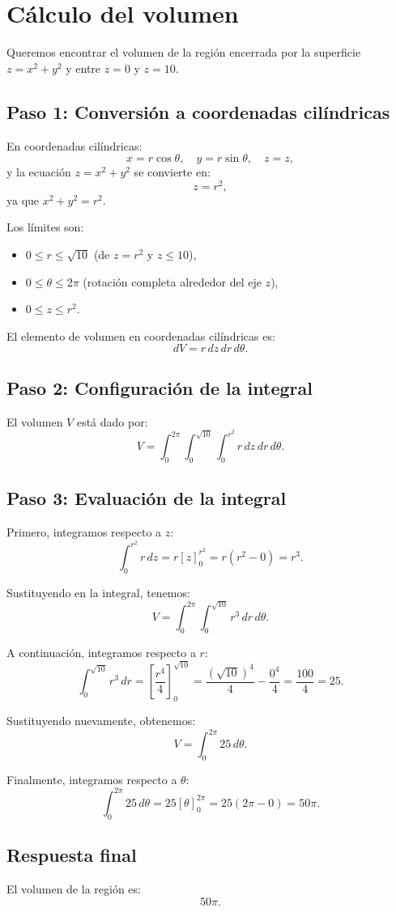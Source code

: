\section*{Cálculo del volumen}

Queremos encontrar el volumen de la región encerrada por la superficie \( z = x^2 + y^2 \) y entre \( z = 0 \) y \( z = 10 \).

\subsection*{Paso 1: Conversión a coordenadas cilíndricas}

En coordenadas cilíndricas:
\[
x = r\cos\theta, \quad y = r\sin\theta, \quad z = z,
\]
y la ecuación \( z = x^2 + y^2 \) se convierte en:
\[
z = r^2,
\]
ya que \( x^2 + y^2 = r^2 \).

Los límites son:
\begin{itemize}
    \item \( 0 \leq r \leq \sqrt{10} \) (de \( z = r^2 \) y \( z \leq 10 \)),
    \item \( 0 \leq \theta \leq 2\pi \) (rotación completa alrededor del eje \( z \)),
    \item \( 0 \leq z \leq r^2 \).
\end{itemize}

El elemento de volumen en coordenadas cilíndricas es:
\[
dV = r \, dz \, dr \, d\theta.
\]

\subsection*{Paso 2: Configuración de la integral}

El volumen \( V \) está dado por:
\[
V = \int_0^{2\pi} \int_0^{\sqrt{10}} \int_0^{r^2} r \, dz \, dr \, d\theta.
\]

\subsection*{Paso 3: Evaluación de la integral}

Primero, integramos respecto a \( z \):
\[
\int_0^{r^2} r \, dz = r[z]_0^{r^2} = r(r^2 - 0) = r^3.
\]

Sustituyendo en la integral, tenemos:
\[
V = \int_0^{2\pi} \int_0^{\sqrt{10}} r^3 \, dr \, d\theta.
\]

A continuación, integramos respecto a \( r \):
\[
\int_0^{\sqrt{10}} r^3 \, dr = \left[\frac{r^4}{4}\right]_0^{\sqrt{10}} = \frac{(\sqrt{10})^4}{4} - \frac{0^4}{4} = \frac{100}{4} = 25.
\]

Sustituyendo nuevamente, obtenemos:
\[
V = \int_0^{2\pi} 25 \, d\theta.
\]

Finalmente, integramos respecto a \( \theta \):
\[
\int_0^{2\pi} 25 \, d\theta = 25[\theta]_0^{2\pi} = 25(2\pi - 0) = 50\pi.
\]

\subsection*{Respuesta final}

El volumen de la región es:
\[
\boxed{50\pi}.
\]
